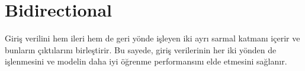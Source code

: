 \section{Bidirectional}
Giriş verilini hem ileri hem de geri yönde işleyen iki ayrı sarmal katmanı içerir ve bunların çıktılarını birleştirir. Bu sayede, giriş verilerinin her iki yönden de işlenmesini ve modelin daha iyi öğrenme performansını elde etmesini sağlanır.

\newpage